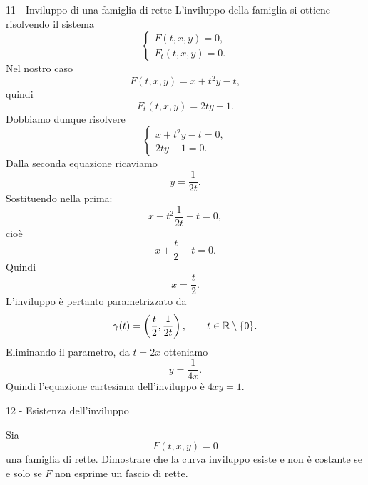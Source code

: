\documentclass[a4paper]{article}
\begin{document}
\begin{snippetsolution}{11 - Inviluppo di una famiglia di rette}
    L'inviluppo della famiglia si ottiene risolvendo il sistema
    \[
        \begin{cases}
            F(t,x,y)=0,\\
            F_t(t,x,y)=0.
        \end{cases}
    \]
    Nel nostro caso
    \[
        F(t,x,y)=x+t^2y-t,
    \]
    quindi
    \[
        F_t(t,x,y)=2ty-1.
    \]
    Dobbiamo dunque risolvere
    \[
        \begin{cases}
            x+t^2y-t=0,\\
            2ty-1=0.
        \end{cases}
    \]
    Dalla seconda equazione ricaviamo
    \[
        y=\frac{1}{2t}.
    \]
    Sostituendo nella prima:
    \[
        x+t^2\frac{1}{2t}-t=0,
    \]
    cioè
    \[
        x+\frac{t}{2}-t=0.
    \]
    Quindi
    \[
        x=\frac{t}{2}.
    \]
    L'inviluppo è pertanto parametrizzato da
    \[
        \gamma(t)=\left(\frac{t}{2},\frac{1}{2t}\right),
        \qquad t\in\mathbb{R}\setminus\{0\}.
    \]
    Eliminando il parametro, da \(t=2x\) otteniamo
    \[
        y=\frac{1}{4x}.
    \]
    Quindi l'equazione cartesiana dell'inviluppo è \(4xy=1\).
\end{snippetsolution}

\pagebreak

\begin{snippetexercise}{12 - Esistenza dell'inviluppo}
    \begin{figure}
        \vspace{-1cm}
    \end{figure}
    Sia
    \[
        F(t,x,y)=0
    \]
    una famiglia di rette. Dimostrare che la curva inviluppo esiste e
    non è costante se e solo se \(F\) non esprime un fascio di rette. \wrapfill
\end{snippetexercise}
\end{document}
